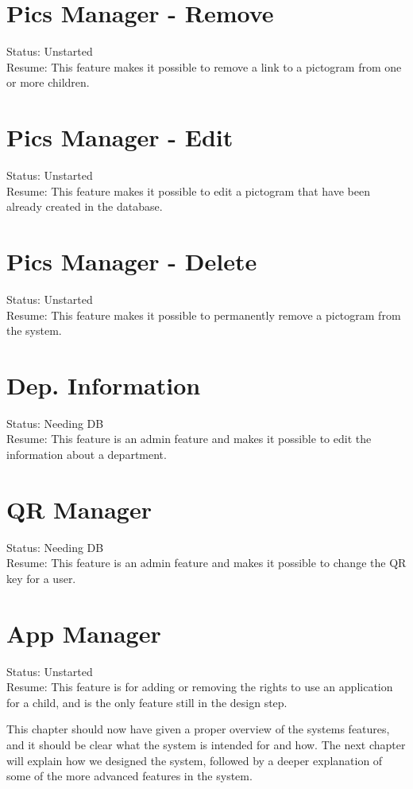 \section{Pics Manager - Remove}
Status: Unstarted\\
Resume: This feature makes it possible to remove a link to a pictogram from one or more children.

\section{Pics Manager - Edit}
Status: Unstarted\\
Resume: This feature makes it possible to edit a pictogram that have been already created in the database.

\section{Pics Manager - Delete}
Status: Unstarted\\
Resume: This feature makes it possible to permanently remove a pictogram from the system.

\section{Dep. Information}
Status: Needing DB\\
Resume: This feature is an admin feature and makes it possible to edit the information about a department.

\section{QR Manager}
Status: Needing DB\\
Resume: This feature is an admin feature and makes it possible to change the QR key for a user.

\section{App Manager}
Status: Unstarted\\
Resume: This feature is for adding or removing the rights to use an application for a child, and is the only feature still in the design step.

This chapter should now have given a proper overview of the systems features, and it should be clear what the system is intended for and how. The next chapter will explain how we designed the system, followed by a deeper explanation of some of the more advanced features in the system.